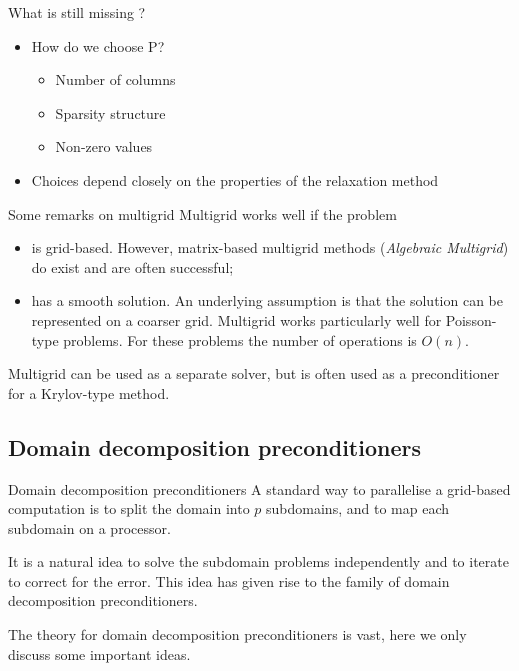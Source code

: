 \begin{frame}{What is still missing ?}
  \begin{itemize}
  \item   How do we choose P?
    \begin{itemize}
    \item Number of columns
    \item Sparsity structure
    \item Non-zero values
    \end{itemize}

 \item Choices depend closely on the properties of the relaxation
method

  \end{itemize}
\end{frame}

\begin{frame}{Some remarks on multigrid}
  Multigrid works well if the problem
  \begin{itemize}
  \item  is grid-based. However, matrix-based multigrid methods
(\emph{Algebraic Multigrid}) do exist and are often successful;
\item has a smooth solution. An underlying assumption is that the
solution can be represented on a coarser grid. Multigrid
works particularly well for Poisson-type problems. For these
problems the number of operations is $O(n).$

  \end{itemize}

Multigrid can be used as a separate solver, but is often used as
a preconditioner for a Krylov-type method.
\end{frame}

\subsection{Domain decomposition preconditioners}
\begin{frame}{Domain decomposition preconditioners}
  A standard way to parallelise a grid-based computation is to split
the domain into $p$ subdomains, and to map each subdomain on a
processor.

It is a natural idea to solve the subdomain problems
independently and to iterate to correct for the error.
This idea has given rise to the family of domain decomposition
preconditioners.

The theory for domain decomposition preconditioners is vast,
here we only discuss some important ideas.
\end{frame}

